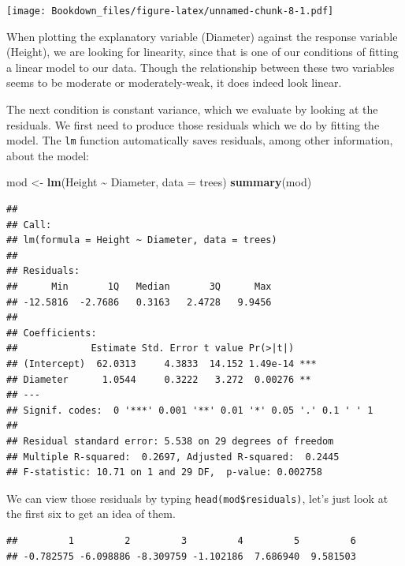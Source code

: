 \documentclass[
]{book}
\newenvironment{Shaded}{\begin{snugshade}}{\end{snugshade}}
\newcommand{\DataTypeTok}[1]{\textcolor[rgb]{0.13,0.29,0.53}{#1}}
\newcommand{\KeywordTok}[1]{\textcolor[rgb]{0.13,0.29,0.53}{\textbf{#1}}}
\newcommand{\NormalTok}[1]{#1}
\newcommand{\OperatorTok}[1]{\textcolor[rgb]{0.81,0.36,0.00}{\textbf{#1}}}
\newcommand{\StringTok}[1]{\textcolor[rgb]{0.31,0.60,0.02}{#1}}
\begin{document}
\texttt{[image: Bookdown\_files/figure-latex/unnamed-chunk-8-1.pdf]}

When plotting the explanatory variable (Diameter) against the response variable (Height), we are looking for linearity, since that is one of our conditions of fitting a linear model to our data. Though the relationship between these two variables seems to be moderate or moderately-weak, it does indeed look linear.

The next condition is constant variance, which we evaluate by looking at the residuals. We first need to produce those residuals which we do by fitting the model. The \texttt{lm} function automatically saves residuals, among other information, about the model:

\begin{Shaded}
\begin{Highlighting}[]
\NormalTok{mod \textless{}{-}}\StringTok{ }\KeywordTok{lm}\NormalTok{(Height }\OperatorTok{\textasciitilde{}}\StringTok{ }\NormalTok{Diameter, }\DataTypeTok{data =}\NormalTok{ trees)}
\KeywordTok{summary}\NormalTok{(mod)}
\end{Highlighting}
\end{Shaded}

\begin{verbatim}
## 
## Call:
## lm(formula = Height ~ Diameter, data = trees)
## 
## Residuals:
##      Min       1Q   Median       3Q      Max 
## -12.5816  -2.7686   0.3163   2.4728   9.9456 
## 
## Coefficients:
##             Estimate Std. Error t value Pr(>|t|)    
## (Intercept)  62.0313     4.3833  14.152 1.49e-14 ***
## Diameter      1.0544     0.3222   3.272  0.00276 ** 
## ---
## Signif. codes:  0 '***' 0.001 '**' 0.01 '*' 0.05 '.' 0.1 ' ' 1
## 
## Residual standard error: 5.538 on 29 degrees of freedom
## Multiple R-squared:  0.2697, Adjusted R-squared:  0.2445 
## F-statistic: 10.71 on 1 and 29 DF,  p-value: 0.002758
\end{verbatim}

We can view those residuals by typing \texttt{head(mod\$residuals)}, let's just look at the first six to get an idea of them.

\begin{Shaded}
\end{Shaded}

\begin{verbatim}
##         1         2         3         4         5         6 
## -0.782575 -6.098886 -8.309759 -1.102186  7.686940  9.581503
\end{verbatim}
\end{document}
